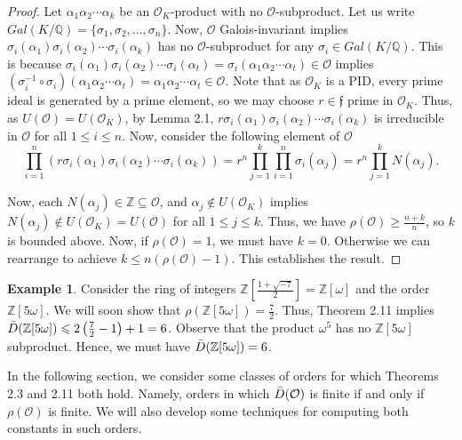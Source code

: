 \documentclass{amsart}
\theoremstyle{definition}
\newtheorem{ex}[lem]{Example}
\newcommand{\MO}{\mathcal{O}}
\newcommand{\bbz}{\mathbb{Z}}
\newcommand{\bbq}{\mathbb{Q}}
\renewcommand{\geq}{\geqslant}
\renewcommand{\leq}{\leqslant}
\numberwithin{equation}{section}
\begin{document}
\begin{proof}
    Let $\alpha_1 \alpha_2 \dotsm \alpha_k$ be an $\MO_K$-product with no $\MO$-subproduct. Let us write $Gal(K/\bbq) = \{\sigma_1, \sigma_2, \dots, \sigma_n\}$. Now, $\MO$ Galois-invariant implies $\sigma_i(\alpha_1) \sigma_i(\alpha_2) \dotsm \sigma_i(\alpha_k)$ has no $\MO$-subproduct for any $\sigma_i \in Gal(K/\bbq)$. This is because $\sigma_i(\alpha_1)\sigma_i(\alpha_2)\dotsm \sigma_i(\alpha_t) = \sigma_i(\alpha_1 \alpha_2 \dotsm \alpha_t) \in \MO$ implies $(\sigma_i^{-1} \circ \sigma_i)(\alpha_1 \alpha_2 \dotsm \alpha_t) = \alpha_1 \alpha_2 \dotsm \alpha_t \in \MO$. Note that as $\MO_K$ is a PID, every prime ideal is generated by a prime element, so we may choose $r \in \mathfrak{f}$ prime in $\MO_K$. Thus, as $U(\MO) = U(\MO_K)$, by Lemma 2.1, $r \sigma_i(\alpha_1)\sigma_i(\alpha_2)\dotsm \sigma_i(\alpha_k)$ is irreducible in $\MO$ for all $1 \leq i \leq n$. Now, consider the following element of $\MO$
    \[
    \prod_{i = 1}^n (r \sigma_i(\alpha_1)\sigma_i(\alpha_2)\dotsm \sigma_i(\alpha_k)) = r^n \prod_{j=1}^k \prod_{i=1}^n \sigma_i(\alpha_j) = r^n \prod_{j=1}^k N(\alpha_j).
    \]

    Now, each $N(\alpha_j) \in \bbz \subseteq \MO$, and $\alpha_j \notin U(\MO_K)$ implies $N(\alpha_j) \notin U(\MO_K) = U(\MO)$ for all $1 \leq j \leq k$. Thus, we have $\rho(\MO) \geq \frac{n + k}{n}$, so $k$ is bounded above. Now, if $\rho(\MO) = 1$, we must have $k = 0$. Otherwise we can rearrange to achieve $k \leq n(\rho(\MO) - 1)$. This establishes the result. 
    \end{proof} 

\begin{ex}
    Consider the ring of integers $\bbz[\frac{1 + \sqrt{-7}}{2}] = \bbz[\omega]$ and the order $\bbz[5\omega]$. We will soon show that $\rho(\bbz[5\omega]) = \frac{7}{2}$. Thus, Theorem 2.11 implies $\Bar{D}(\bbz[5\omega]) \leq 2 \left( \frac{7}{2} - 1 \right) + 1 = 6$. Observe that the product $\omega^5$ has no $\bbz[5\omega]$ subproduct. Hence, we must have  $\Bar{D}(\bbz[5\omega]) = 6$.
\end{ex}

In the following section, we consider some classes of orders for which Theorems 2.3 and 2.11 both hold. Namely, orders in which $\Bar{D}(\MO)$ is finite if and only if $\rho(\MO)$ is finite. We will also develop some techniques for computing both constants in such orders.
\end{document}
